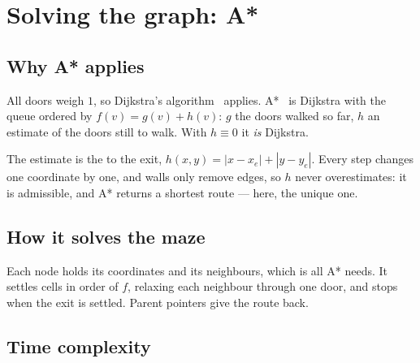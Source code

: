 \section{Solving the graph: A*}
\label{sec:astar}

\subsection{Why A* applies}

All doors weigh $1$, so Dijkstra's algorithm~\cite{dijkstra1959note} applies.
A*~\cite{hart1968formal} is Dijkstra with the queue ordered by
$f(v)=g(v)+h(v)$: $g$ the doors walked so far, $h$ an estimate of the doors
still to walk. With $h\equiv0$ it \emph{is} Dijkstra.

The estimate is the  to the exit,
$h(x,y)=|x-x_e|+|y-y_e|$. Every step changes one coordinate by one, and walls
only remove edges, so $h$ never overestimates: it is admissible, and A* returns
a shortest route --- here, the unique one.

\subsection{How it solves the maze}

Each node holds its coordinates and its neighbours, which is all A* needs. It
settles cells in order of $f$, relaxing each neighbour through one door, and
stops when the exit is settled. Parent pointers give the route back.

\begin{algorithm}[H]
\caption{A* from $s$ to the exit $e$ on the graph $N$.}
\label{alg:astar}
\end{algorithm}

\subsection{Time complexity}

